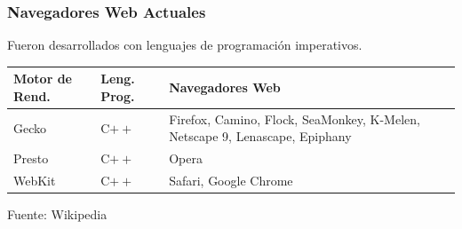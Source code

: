 \documentclass[12pt]{beamer}
\begin{document}
\begin{frame}
\frametitle{Navegadores Web Actuales}
	\begin{figure}
	\end{figure}

	Fueron desarrollados con lenguajes de programación imperativos.

	\begin{tabular}[]{|l|l|p{5cm}|} \hline
	\textbf{Motor de Rend.} &	\textbf{Leng. Prog.}	&	\textbf{Navegadores Web} \\
	\hline
	Gecko					&	C$++$					&	Firefox, Camino, Flock, 
															SeaMonkey,	K-Melen, Netscape 9, 
															Lenascape, Epiphany \\
	\hline
	Presto					&	C$++$					&	Opera	\\
	\hline
	WebKit					&	C$++$					&	Safari, Google Chrome \\
	\hline
	\end{tabular}
	{\tiny Fuente: Wikipedia}
\end{frame}
\end{document}
